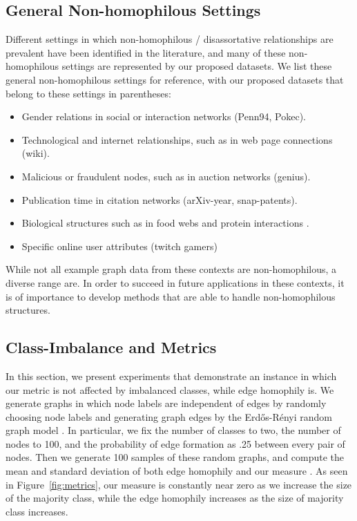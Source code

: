 \documentclass{article}
\begin{document}
\subsection{General Non-homophilous Settings}

Different settings in which non-homophilous / disassortative relationships are prevalent have been identified in the literature, and many of these non-homophilous settings are represented by our proposed datasets. We list these general non-homophilous settings for reference, with our proposed datasets that belong to these settings in parentheses:
\begin{itemize}
    \item Gender relations in social or interaction networks  \cite{altenburger2018monophily, chin2019decoupled, jia2020residual} (Penn94, Pokec).
    \item Technological and internet relationships, such as in web page connections \cite{newman2003mixing, pei2019geom} (wiki).
    \item Malicious or fraudulent nodes, such as in auction networks \cite{chau2006detecting, pandit2007netprobe} (genius).
    \item Publication time in citation networks \cite{peel2017graph} (arXiv-year, snap-patents).
    \item Biological structures such as in food webs \cite{gatterbauer2014semi} and protein interactions \cite{newman2003mixing}.
    \item Specific online user attributes \cite{rozemberczki2021twitch} (twitch gamers) 
\end{itemize}
While not all example graph data from these contexts are non-homophilous, a diverse range are. In order to succeed in future applications in these contexts, it is of importance to develop methods that are able to handle non-homophilous structures.



\subsection{Class-Imbalance and Metrics}


In this section, we present experiments that demonstrate an instance in which our metric is not affected by imbalanced classes, while edge homophily is. We generate graphs in which node labels are independent of edges by randomly choosing node labels and generating graph edges by the Erd\H{o}s-R\'enyi random graph model \cite{erdHos1960evolution}. In particular, we fix the number of classes to two, the number of nodes to 100, and the probability of edge formation as .25 between every pair of nodes. Then we generate 100 samples of these random graphs, and compute the mean and standard deviation of both edge homophily  and our measure . As seen in Figure~\ref{fig:metrics}, our measure  is constantly near zero as we increase the size of the majority class, while the edge homophily  increases as the size of majority class increases. 
\end{document}
